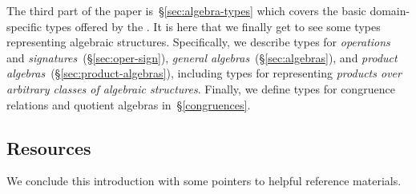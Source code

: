 The third part of the paper is~\S\ref{sec:algebra-types} which covers the basic domain-specific types offered by the \ualib. It is here that we finally get to see some types representing algebraic structures.  Specifically, we describe types for \emph{operations} and \emph{signatures}~(\S\ref{sec:oper-sign}), \emph{general algebras}~(\S\ref{sec:algebras}), and \emph{product algebras}~(\S\ref{sec:product-algebras}), including types for representing \emph{products over arbitrary classes of algebraic structures}. Finally, we define types for congruence relations and quotient algebras in~\S\ref{congruences}.

\newcommand\otherparta{\textit{Part 2: homomorphisms, terms, and subalgebras}~\cite{DeMeo:2021-2}.}
\newcommand\otherpartb{\textit{Part 3: free algebras, equational classes, and Birkhoff's theorem}~\cite{DeMeo:2021-3}.}

\subsection{Resources}
We conclude this introduction with some pointers to helpful reference materials.

